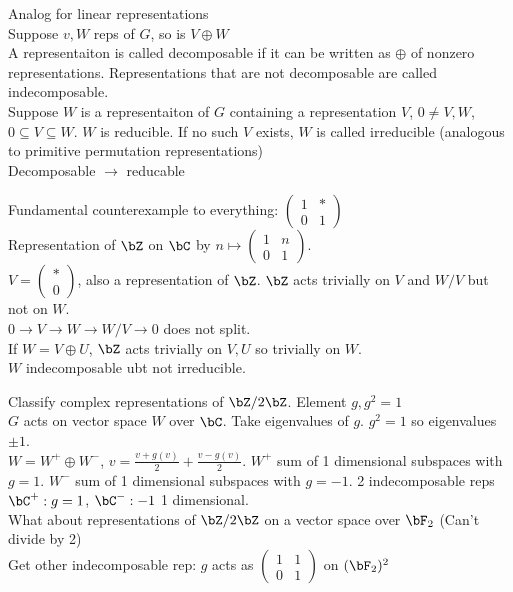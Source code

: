 \noindent
Analog for linear representations \\
Suppose $v, W$ reps of $G$, so is $V \oplus W$ \\
A representaiton is called decomposable if it can be written as $\oplus$ of nonzero representations. Representations that are not decomposable are called indecomposable. \\
Suppose $W$ is a representaiton of $G$ containing a representation $V$, $0 \neq V, W$, $0 \subseteq V \subseteq W$. $W$ is reducible. If no such $V$ exists, $W$ is called irreducible (analogous to primitive permutation representations) \\
Decomposable $\to$ reducable 

\noindent
Fundamental counterexample to everything: $\begin{pmatrix} 1 & * \\ 0 & 1 \end{pmatrix}$ \\
Representation of $\bZ$  on $\bC$ by $n \mapsto \begin{pmatrix} 1 & n \\ 0 & 1 \end{pmatrix}$. \\
$V = \begin{pmatrix} * \\ 0 \end{pmatrix}$, also a representation of $\bZ$. $\bZ$ acts trivially on $V$ and $W/V$ but not on $W$. \\
$0 \to V \to W \to W/V \to 0$ does not split. \\
If $W = V \oplus U$, $\bZ$ acts trivially on $V, U$ so trivially on $W$. \\
$W$ indecomposable ubt not irreducible. 

\noindent
Classify complex representations of $\bZ/2\bZ$. Element $g, g^2=1$ \\
$G$ acts on vector space $W$ over $\bC$. Take eigenvalues of $g$. $g^2=1$ so eigenvalues $\pm 1$. \\
$W = W^+ \oplus W^-$, $v = \frac{v + g(v)}{2} + \frac{v - g(v)}{2}$. $W^+$ sum of 1 dimensional subspaces with $g=1$. $W^-$ sum of 1 dimensional subspaces with $g=-1$. 2 indecomposable reps $\bC^+ : g=1$, $\bC^-: -1$ 1 dimensional. \\
What about representations of $\bZ/2\bZ$ on a vector space over $\bF_2$ (Can't divide by 2) \\
Get other indecomposable rep: $g$ acts as $\begin{pmatrix} 1 & 1 \\ 0 & 1 \end{pmatrix}$ on $(\bF_2)^2$ 

